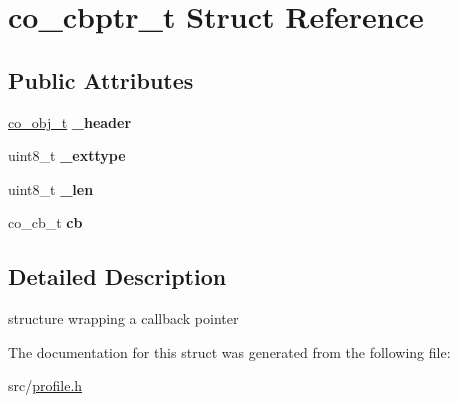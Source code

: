 \hypertarget{structco__cbptr__t}{\section{co\+\_\+cbptr\+\_\+t Struct Reference}
\label{structco__cbptr__t}
}
\subsection*{Public Attributes}
\begin{DoxyCompactItemize}
\item 
\hypertarget{structco__cbptr__t_a9ded517d6461d4c829b450625b890c49}{\hyperlink{structco__obj__t}{co\+\_\+obj\+\_\+t} {\bfseries \+\_\+header}}\label{structco__cbptr__t_a9ded517d6461d4c829b450625b890c49}

\item 
\hypertarget{structco__cbptr__t_a3718779cdc08d9896e730cbd5048a4a2}{uint8\+\_\+t {\bfseries \+\_\+exttype}}\label{structco__cbptr__t_a3718779cdc08d9896e730cbd5048a4a2}

\item 
\hypertarget{structco__cbptr__t_a769aa2644568b8dfe3d8ccc8b3e3d1d9}{uint8\+\_\+t {\bfseries \+\_\+len}}\label{structco__cbptr__t_a769aa2644568b8dfe3d8ccc8b3e3d1d9}

\item 
\hypertarget{structco__cbptr__t_aff2d976115dd1c8cacdacc06df55f53c}{co\+\_\+cb\+\_\+t {\bfseries cb}}\label{structco__cbptr__t_aff2d976115dd1c8cacdacc06df55f53c}

\end{DoxyCompactItemize}


\subsection{Detailed Description}
structure wrapping a callback pointer 

The documentation for this struct was generated from the following file\+:\begin{DoxyCompactItemize}
\item 
src/\hyperlink{profile_8h}{profile.\+h}\end{DoxyCompactItemize}
